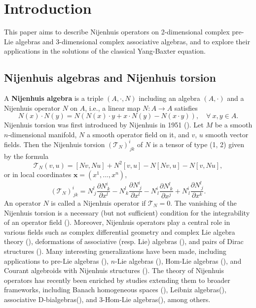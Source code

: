 \documentclass[12pt, reqno]{amsart}
\theoremstyle{plain}
\newcommand{\cleqn}{\setcounter{equation}{0}}
\newcommand{\clth}{\setcounter{theorem}{0}}
\newcommand {\sectionnew}[1]{\section{#1}\cleqn\clth}
\newcommand \lb[1]{\label{#1}}
\begin{document}



\maketitle
\tableofcontents
\allowdisplaybreaks
\sectionnew{Introduction}\lb{intro}
This paper aims to describe Nijenhuis operators on 2-dimensional complex pre-Lie algebras and 3-dimensional complex associative algebras, and to explore their applications in the solutions of the classical Yang-Baxter equation.
\subsection{Nijenhuis algebras and Nijenhuis torsion}
A \textbf{Nijenhuis algebra} is a triple $(A,\cdot, N)$ including an algebra $(A,\cdot)$ and a Nijenhuis operator $N$ on $A$, i.e., a linear map $N : A \rightarrow  A$ satisfies
\begin{equation}\label{eq:Ni ope1}
N(x) \cdot N(y)=N(N(x) \cdot  y+x \cdot N(y)-N(x \cdot  y)),\quad\forall~ x, y \in A.
\end{equation}
Nijenhuis torsion was first introduced by Nijenhuis in 1951 (\cite{Nijenhuis}).
Let $M$ be a smooth $n$-dimensional manifold, $N$ a smooth operator field on it, and
$v$, $u$ smooth vector fields. Then the Nijenhuis torsion $(\mathcal{T}_N)_{~jk}^{i}$ of $N$ is a tensor of type (1, 2) given by the formula
$$
\mathcal{T}_N(v,u)=[Nv,Nu]+N^2[v,u]-N[Nv,u]-N[v,Nu],
$$
or in local coordinates $\mathbf{x}=(x^1,...,x^n)$,
$$
(\mathcal{T}_N)_{~jk}^{i}=N_{~j}^l\frac{\partial N_{~k}^i}{\partial x^l}-N_{~k}^l\frac{\partial N_{~j}^i}{\partial x^l}-N_{~l}^i\frac{\partial N_{~k}^l}{\partial x^j}+N_{~l}^i\frac{\partial N_{~j}^l}{\partial x^k}.
$$
An operator $N$ is called a Nijenhuis operator if $\mathcal{T}_N = 0$. The vanishing of the Nijenhuis torsion is a necessary (but not sufficient) condition for the integrability of an operator field (\cite{Konyaev}). Moreover, Nijenhuis operators play a central role in various fields such as complex differential geometry and complex Lie algebra theory (\cite{Wells}), deformations of associative (resp. Lie) algebras (\cite{Gerstenhaber,Nijenhuis-2}), and pairs of Dirac structures (\cite{clem,Dorfman}). Many interesting generalizations have been made, including applications to pre-Lie algebras (\cite{Wang}), $n$-Lie algebras (\cite{Liu}), Hom-Lie algebras (\cite{Das}), and Courant algebroids with Nijenhuis structures (\cite{Kos}). The theory of Nijenhuis operators has recently been enriched by studies extending them to broader frameworks, including Banach homogeneous spaces (\cite{Golinski2}), Leibniz algebras(\cite{Mondal}), associative D-bialgebras(\cite{Ma}), and 3-Hom-Lie algebras(\cite{Li}), among others.
\end{document}

